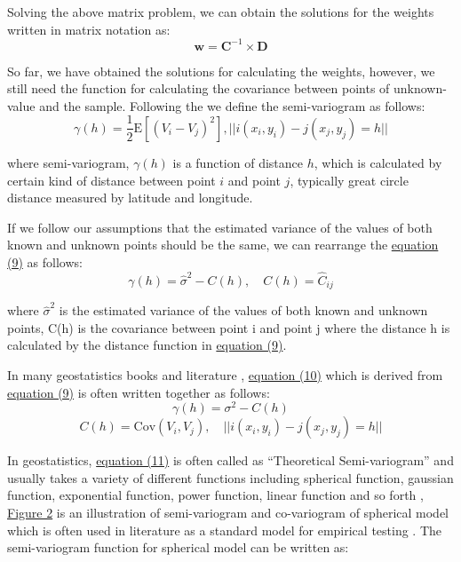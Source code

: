 \documentclass[a4paper, 12pt]{article} %
\begin{document}
Solving the above matrix problem, we can obtain the solutions for the weights written in matrix notation as:
\begin{equation}
\label{eq8}
\boldsymbol{w} = \boldsymbol{C}^{-1}  \times \boldsymbol{D}
\end{equation}

So far, we have obtained the solutions for calculating the weights, however, we still need the function for calculating the covariance between points of unknown-value and the sample. Following the \citep{isaaks1989introduction} we define the semi-variogram as follows:
\begin{equation}
\label{eq9}
\gamma(h) = \dfrac{1}{2} \mathrm{E}[(V_i - V_j)^2], || i(x_i, y_i) - j(x_j, y_j) = h||
\end{equation}

\noindent where semi-variogram, $\gamma(h)$ is a function of distance $h$, which is calculated by certain kind of distance between point $i$ and point $j$, typically great circle distance measured by latitude and longitude. 

If we follow our assumptions that the estimated variance of the values of both known and unknown points should be the same, we can rearrange the \hyperref[eq9]{equation (9)} as follows:
\begin{equation}
\label{eq10}
\gamma(h) = \widehat{\sigma}^2 - C(h), \quad C(h) = \widehat{C}_{ij}
\end{equation}

\noindent where $\widehat{\sigma}^2$ is the estimated variance of the values of both known and unknown points, C(h) is the covariance between point i and point j where the distance h is calculated by the distance function in \hyperref[eq9]{equation (9)}.

In many geostatistics books and literature \citep{isaaks1989introduction, cressie1992statistics}, \hyperref[eq10]{equation (10)} which is derived from  \hyperref[eq9]{equation (9)} is often written together as follows:
\begin{equation}
\label{eq11}
\gamma(h) = \sigma^2 - C(h)
\end{equation}
\begin{equation}
\label{eq12}
 C(h) = \mathrm{Cov}(V_i, V_j),  \quad ||i(x_i, y_i) - j(x_j, y_j) = h ||
\end{equation}

In geostatistics, \hyperref[eq11]{equation (11)} is often called as “Theoretical Semi-variogram” and usually takes a variety of different functions including spherical function, gaussian function, exponential function, power function, linear function and so forth \citep{isaaks1989introduction, cressie1992statistics,liu2009taylor}, \hyperref[fig2]{Figure 2} is an illustration of semi-variogram and co-variogram of spherical model which is often used in literature as a standard model for empirical testing \citep{cressie1992statistics, chica1995spatial, basu1998analysis, gillen2001anisotropic, kuntz2014geostatistical}. The semi-variogram function for spherical model can be written as:
\end{document}
